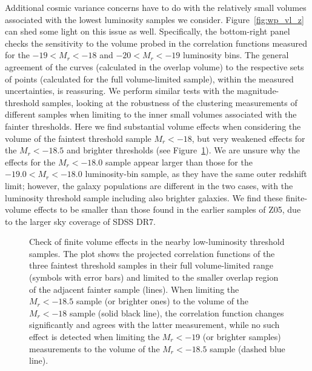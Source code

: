 \documentclass[]{emulateapj}
\begin{document}
Additional cosmic variance concerns have to do with the relatively small 
volumes associated with the lowest luminosity samples we consider.
Figure~\ref{fig:wp_vl_z} 
can shed some light on this issue as well. Specifically, the bottom-right 
panel checks the sensitivity to the volume probed in the correlation functions 
measured for the $-19<M_r<-18$ and $-20<M_r<-19$ luminosity bins. The general 
agreement of the curves (calculated in the overlap volume) to the respective 
sets of points (calculated for the full volume-limited sample), within the 
measured uncertainties, is reassuring.   We perform similar tests with the 
magnitude-threshold samples, looking at the robustness of the clustering 
measurements of different samples when limiting to the inner small volumes 
associated with the fainter thresholds. 
Here we find substantial volume effects 
when considering the volume of the faintest threshold sample $M_r<-18$,  but 
very weakened effects for the $M_r<-18.5$ and brighter thresholds
(see Figure~\ref{fig:wp_lvoid}).
We are unsure why the effects for the $M_r<-18.0$ sample appear larger
than those for the $-19.0<M_r<-18.0$ luminosity-bin sample, as they
have the same outer redshift limit; however, 
the galaxy populations are different in the two cases, with the luminosity
threshold sample including also brighter galaxies. We find these finite-volume
effects to be smaller than those found in the earlier samples of Z05, due 
to the larger sky coverage of SDSS DR7.



\begin{figure}[tbp]
\caption[]{\label{fig:wp_lvoid}
Check of finite volume effects in the nearby low-luminosity threshold
samples. The plot shows the projected correlation functions of the three 
faintest threshold samples in their full volume-limited range
(symbols with error bars) and limited to the smaller overlap region of the 
adjacent fainter sample (lines).   When limiting the $M_r<-18.5$ sample 
(or brighter ones) to the volume of the $M_r<-18$ sample (solid black line), 
the correlation function changes significantly and agrees with the latter 
measurement,  while no such effect is detected when limiting the $M_r<-19$
(or brighter samples) measurements
to the volume of the $M_r<-18.5$ sample (dashed blue line).
}
\end{figure}
\end{document}
